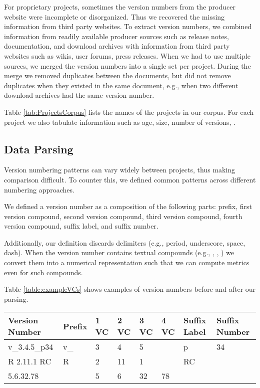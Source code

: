 \documentclass[conference]{IEEEtran}
\begin{document}
For proprietary projects, sometimes the version numbers from the producer website
were incomplete or disorganized. Thus we recovered the missing information from third party websites.
To extract version numbers, we combined information from readily available producer sources such as release notes, documentation, and download archives
with information from third party websites such as wikis, user forums, press releases.
When we had to use multiple sources, we merged the version numbers into a single set per project. During the merge we removed duplicates between the documents, but did not remove duplicates when they existed in the same document, e.g., when two different download archives had the same version number.

Table \ref{tab:ProjectsCorpus} lists the names of the projects in our corpus. For each project we also tabulate information such as age, size, number of versions, .

\subsection{Data Parsing}

 Version numbering patterns can vary widely between projects, thus making comparison difficult. 
To counter this, we defined common patterns across different numbering approaches. 

We defined a version number as a composition of the following parts: 
prefix, first version compound, second
 version compound, third version compound, fourth version compound, suffix label, and suffix number. 

Additionally, our definition discards delimiters (e.g., period, underscore, space, dash). When the version number contains textual compounds (e.g., , , ) we convert them into a numerical representation such that we can compute metrics even for such compounds. 

Table \ref{table:exampleVCs} shows examples of version numbers before-and-after 
our parsing.
 
 \begin{table*}[t]
\begin{center}
\begin{tabular}{| *{8}{l|}}
\hline
Version Number & Prefix & 1 VC & 2 VC & 3 VC & 4 VC  & Suffix Label & Suffix Number \\ \hline
v\_3.4.5\_p34 & v\_ & 3 & 4 & 5 & & p & 34 \\
R 2.11.1 RC & R & 2 & 11 & 1 & & RC & \\
5.6.32.78 &  & 5 & 6 & 32 & 78 & & \\ \hline

\end{tabular}
\end{center}
\caption{Numeric version compounds are bolded. }
\label{table:exampleVCs}
\end{table*}
 
\end{document}
